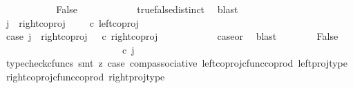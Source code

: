\begin{isabellebody}
\ \ \ \ \ \ \ \ \isamarkupfalse%
\ \isamarkupfalse%
\ False\isanewline
\ \ \ \ \ \ \ \ \ \ \isamarkupfalse%
\ true{\isacharunderscore}{\kern0pt}false{\isacharunderscore}{\kern0pt}distinct\ \isamarkupfalse%
\ blast\isanewline
\ \ \ \ \ \ \isamarkupfalse%
\isanewline
\ \ \ \ \isamarkupfalse%
\isanewline
\ \ \ \ \ \ \isamarkupfalse%
\ {\isachardoublequoteopen}j\ {\isasymnoteq}\ right{\isacharunderscore}{\kern0pt}coproj\ {\isasymone}\ {\isacharparenleft}{\kern0pt}{\isasymone}\ {\isasymCoprod}\ {\isasymone}{\isacharparenright}{\kern0pt}\ {\isasymcirc}\isactrlsub c\ left{\isacharunderscore}{\kern0pt}coproj\ {\isasymone}\ {\isasymone}{\isachardoublequoteclose}\isanewline
\ \ \ \ \ \ \isamarkupfalse%
\ \isamarkupfalse%
\ case{}{\isacharcolon}{\kern0pt}\ {\isachardoublequoteopen}j\ {\isacharequal}{\kern0pt}\ right{\isacharunderscore}{\kern0pt}coproj\ {\isasymone}\ {\isacharparenleft}{\kern0pt}{\isasymone}{\isasymCoprod}{\isasymone}{\isacharparenright}{\kern0pt}\ {\isasymcirc}\isactrlsub c\ right{\isacharunderscore}{\kern0pt}coproj\ {\isasymone}\ {\isasymone}{\isachardoublequoteclose}\isanewline
\ \ \ \ \ \ \ \ \isamarkupfalse%
\ case{}{\isacharunderscore}{\kern0pt}or{\isacharunderscore}{\kern0pt}{}\ \isamarkupfalse%
\ blast\isanewline
\ \ \ \ \ \ \isamarkupfalse%
\ False\isanewline
\ \ \ \ \ \ \isamarkupfalse%
\ {\isacharminus}{\kern0pt}\ \isanewline
\ \ \ \ \ \ \ \ \isamarkupfalse%
\ {\isachardoublequoteopen}{\isacharparenleft}{\kern0pt}{\isasymlangle}{\isasymt}{\isacharcomma}{\kern0pt}\ {\isasymt}{\isasymrangle}{\isasymamalg}\ {\isacharparenleft}{\kern0pt}{\isasymlangle}{\isasymf}{\isacharcomma}{\kern0pt}\ {\isasymf}{\isasymrangle}\ {\isasymamalg}{\isasymlangle}{\isasymf}{\isacharcomma}{\kern0pt}\ {\isasymt}{\isasymrangle}{\isacharparenright}{\kern0pt}{\isacharparenright}{\kern0pt}\ {\isasymcirc}\isactrlsub c\ j\ {\isacharequal}{\kern0pt}\ {\isasymlangle}{\isasymf}{\isacharcomma}{\kern0pt}\ {\isasymt}{\isasymrangle}{\isachardoublequoteclose}\isanewline
\ \ \ \ \ \ \ \ \ \ \isamarkupfalse%
\ {\isacharparenleft}{\kern0pt}typecheck{\isacharunderscore}{\kern0pt}cfuncs{\isacharcomma}{\kern0pt}\ smt\ {\isacharparenleft}{\kern0pt}z{}{\isacharparenright}{\kern0pt}\ case{}\ comp{\isacharunderscore}{\kern0pt}associative{}\ left{\isacharunderscore}{\kern0pt}coproj{\isacharunderscore}{\kern0pt}cfunc{\isacharunderscore}{\kern0pt}coprod\ left{\isacharunderscore}{\kern0pt}proj{\isacharunderscore}{\kern0pt}type\ right{\isacharunderscore}{\kern0pt}coproj{\isacharunderscore}{\kern0pt}cfunc{\isacharunderscore}{\kern0pt}coprod\ right{\isacharunderscore}{\kern0pt}proj{\isacharunderscore}{\kern0pt}type{\isacharparenright}{\kern0pt}\isanewline

\end{isabellebody}

